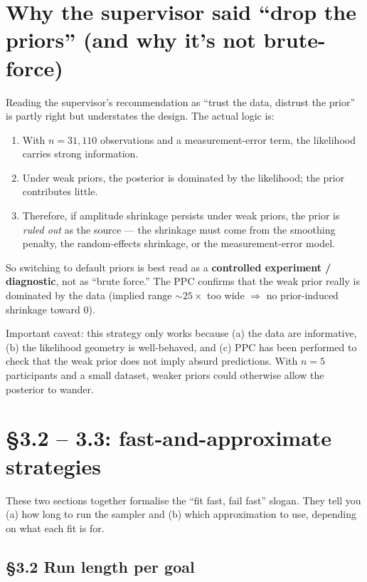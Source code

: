 \documentclass[11pt,a4paper]{article}
\begin{document}
\section*{Why the supervisor said ``drop the priors'' (and why it's not brute-force)}

Reading the supervisor's recommendation as ``trust the data, distrust
the prior'' is partly right but understates the design. The actual
logic is:

\begin{enumerate}\setlength{\itemsep}{0pt}
    \item With $n = 31{,}110$ observations and a measurement-error
          term, the likelihood carries strong information.
    \item Under weak priors, the posterior is dominated by the
          likelihood; the prior contributes little.
    \item Therefore, if amplitude shrinkage persists under weak
          priors, the prior is \emph{ruled out} as the source ---
          the shrinkage must come from the smoothing penalty, the
          random-effects shrinkage, or the measurement-error model.
\end{enumerate}

\noindent So switching to default priors is best read as a
\textbf{controlled experiment / diagnostic}, not as ``brute force.''
The PPC confirms that the weak prior really is dominated by the data
(implied range $\sim 25\times$ too wide $\Rightarrow$ no
prior-induced shrinkage toward 0).

\medskip
\noindent Important caveat: this strategy only works because (a) the
data are informative, (b) the likelihood geometry is well-behaved,
and (c) PPC has been performed to check that the weak prior does not
imply absurd predictions. With $n = 5$ participants and a small
dataset, weaker priors could otherwise allow the posterior to wander.

\section*{\S 3.2 -- 3.3: fast-and-approximate strategies}

These two sections together formalise the ``fit fast, fail fast''
slogan. They tell you (a) how long to run the sampler and (b)
which approximation to use, depending on what each fit is for.

\subsection*{\S 3.2 Run length per goal}
\end{document}
